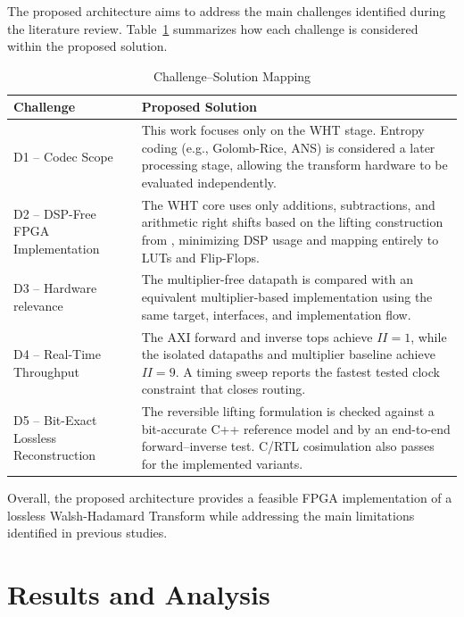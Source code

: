 \documentclass[conference]{IEEEtran}
\begin{document}
The proposed architecture aims to address the main challenges identified during the literature review. Table~\ref{tab:challenge_solution} summarizes how each challenge is considered within the proposed solution.

\begin{table}[htbp]
\caption{Challenge--Solution Mapping}
\label{tab:challenge_solution}
\centering
\begin{tabular}{|p{2.1cm}|p{5.2cm}|}
\hline
\textbf{Challenge} & \textbf{Proposed Solution} \\
\hline

D1 -- Codec Scope &
This work focuses only on the WHT stage. Entropy coding (e.g., Golomb-Rice, ANS) is considered a later processing stage, allowing the transform hardware to be evaluated independently.
\\ \hline

D2 -- DSP-Free FPGA Implementation &
The WHT core uses only additions, subtractions, and arithmetic right shifts based on the lifting construction from \cite{jung1997}, minimizing DSP usage and mapping entirely to LUTs and Flip-Flops.
\\ \hline

D3 -- Hardware relevance &
The multiplier-free datapath is compared with an equivalent multiplier-based implementation using the same target, interfaces, and implementation flow.
\\ \hline

D4 -- Real-Time Throughput &
The AXI forward and inverse tops achieve $II=1$, while the isolated datapaths and multiplier baseline achieve $II=9$. A timing sweep reports the fastest tested clock constraint that closes routing.
\\ \hline

D5 -- Bit-Exact Lossless Reconstruction &
The reversible lifting formulation is checked against a bit-accurate C++ reference model and by an end-to-end forward--inverse test. C/RTL cosimulation also passes for the implemented variants.
\\ \hline

\end{tabular}
\end{table}

Overall, the proposed architecture provides a feasible FPGA implementation of a lossless Walsh-Hadamard Transform while addressing the main limitations identified in previous studies.


\section{Results and Analysis}
\end{document}
